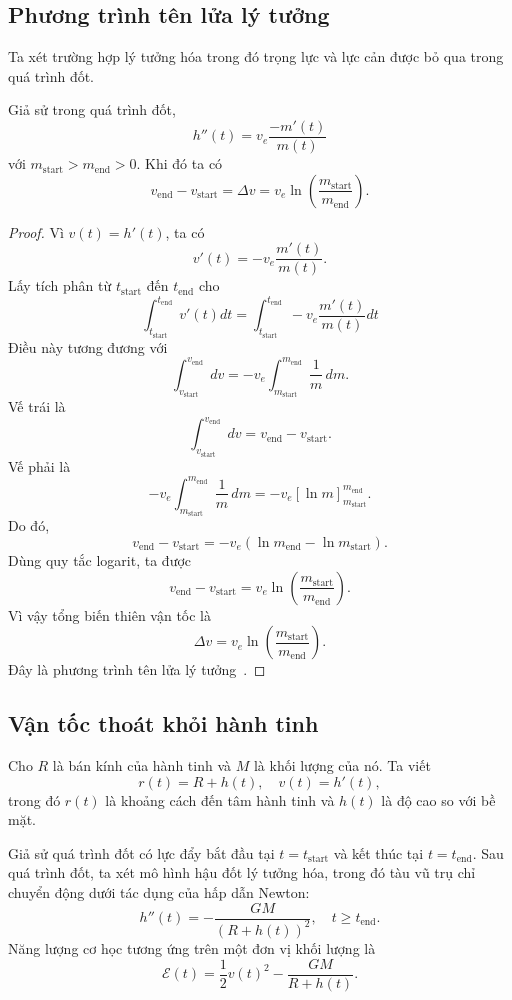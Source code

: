 ﻿\documentclass[12pt]{article}
\begin{document}
\subsection{Phương trình tên lửa lý tưởng}
Ta xét trường hợp lý tưởng hóa trong đó trọng lực và lực cản được bỏ qua trong quá trình đốt.
\begin{lemma}
    Giả sử trong quá trình đốt,
    \[
 h''(t)
 =
 v_e\frac{-m'(t)}{m(t)}
 \]
    với $m_{\mathrm{start}} > m_{\mathrm{end}} > 0$. Khi đó ta có
    \[
 v_{\mathrm{end}} - v_{\mathrm{start}} = \Delta v
 =
 v_e\ln\left(\frac{m_{\mathrm{start}}}{m_{\mathrm{end}}}\right).\]
\end{lemma}
\begin{proof}
Vì $v(t) = h'(t)$, ta có
\[
 v'(t) = -v_e\frac{m'(t)}{m(t)}.
\]
Lấy tích phân từ $t_{\mathrm{start}}$ đến $t_{\mathrm{end}}$ cho
\[ \int_{t_{\mathrm{start}}}^{t_{\mathrm{end}}}v'(t)dt = \int_{t_{\mathrm{start}}}^{t_{\mathrm{end}}} - v_e\frac{m'(t)}{m(t)}dt
\]
Điều này tương đương với
\[ \int_{v_{\mathrm{start}}}^{v_{\mathrm{end}}}dv = -v_e \int_{m_{\mathrm{start}}}^{m_{\mathrm{end}}}\frac{1}{m}\, dm.
\]
Vế trái là
\[ \int_{v_{\mathrm{start}}}^{v_{\mathrm{end}}}dv = v_{\mathrm{end}} - v_{\mathrm{start}}.
\]
Vế phải là
\[
 -v_e \int_{m_{\mathrm{start}}}^{m_{\mathrm{end}}}\frac{1}{m}\, dm = -v_e \left[\ln m\right]_{m_{\mathrm{start}}}^{m_{\mathrm{end}}}.
\]
Do đó,
\[
 v_{\mathrm{end}} - v_{\mathrm{start}} = -v_e(\ln m_{\mathrm{end}} - \ln m_{\mathrm{start}}).
\]
Dùng quy tắc logarit, ta được
\[
 v_{\mathrm{end}} - v_{\mathrm{start}} = v_e\ln\left(\frac{m_{\mathrm{start}}}{m_{\mathrm{end}}}\right).
\]
Vì vậy tổng biến thiên vận tốc là
\[
 \boxed{ \Delta v = v_e\ln\left(\frac{m_{\mathrm{start}}}{m_{\mathrm{end}}}\right). }
\]
Đây là phương trình tên lửa lý tưởng~\cite{nasa_glenn_ideal_rocket_equation}.
    
\end{proof}
\subsection{Vận tốc thoát khỏi hành tinh}

Cho $R$ là bán kính của hành tinh và $M$ là khối lượng của nó.
Ta viết
\[
 r(t) = R + h(t),\quad v(t) = h'(t),
\]
trong đó $r(t)$ là khoảng cách đến tâm hành tinh và $h(t)$ là độ cao so với bề mặt.

Giả sử quá trình đốt có lực đẩy bắt đầu tại $t = t_{\mathrm{start}}$ và kết thúc tại $t = t_{\mathrm{end}}$.
Sau quá trình đốt, ta xét mô hình hậu đốt lý tưởng hóa, trong đó tàu vũ trụ chỉ chuyển động dưới tác dụng của hấp dẫn Newton:
\[
 h''(t) = -\frac{GM}{(R + h(t))^2},
 \quad t\ge t_{\mathrm{end}}.
\]
Năng lượng cơ học tương ứng trên một đơn vị khối lượng là
\[
 \mathcal E(t)
 =
 \frac{1}{2}v(t)^2 - \frac{GM}{R + h(t)}.
\]
\end{document}

